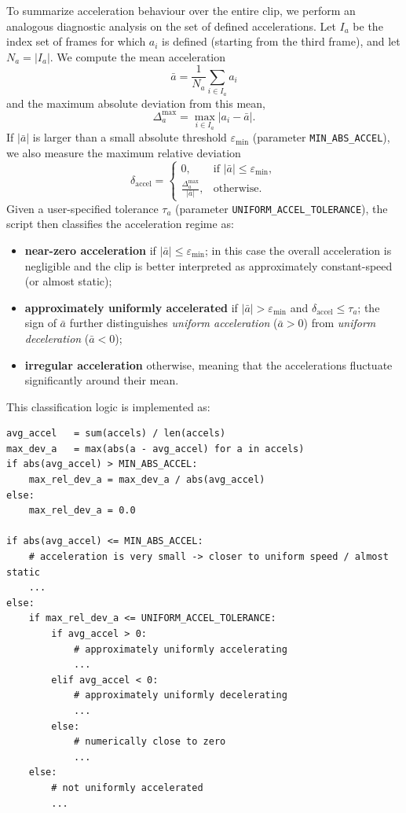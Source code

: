 To summarize acceleration behaviour over the entire clip, we perform an analogous diagnostic analysis on the set of defined accelerations. Let \(I_a\) be the index set of frames for which \(a_i\) is defined (starting from the third frame), and let \(N_a = |I_a|\). We compute the mean acceleration
\[
\bar{a} = \frac{1}{N_a} \sum_{i \in I_a} a_i
\]
and the maximum absolute deviation from this mean,
\[
\Delta_a^{\max} = \max_{i \in I_a} |a_i - \bar{a}|.
\]
If \(|\bar{a}|\) is larger than a small absolute threshold \(\varepsilon_{\min}\) (parameter \texttt{MIN\_ABS\_ACCEL}), we also measure the maximum relative deviation
\[
\delta_{\text{accel}} =
\begin{cases}
0, & \text{if } |\bar{a}| \le \varepsilon_{\min}, \\[4pt]
\displaystyle \frac{\Delta_a^{\max}}{|\bar{a}|}, & \text{otherwise.}
\end{cases}
\]
Given a user-specified tolerance \(\tau_a\) (parameter \texttt{UNIFORM\_ACCEL\_TOLERANCE}), the script then classifies the acceleration regime as:
\begin{itemize}
  \item \textbf{near-zero acceleration} if \(|\bar{a}| \le \varepsilon_{\min}\); in this case the overall acceleration is negligible and the clip is better interpreted as approximately constant-speed (or almost static);
  \item \textbf{approximately uniformly accelerated} if \(|\bar{a}| > \varepsilon_{\min}\) and \(\delta_{\text{accel}} \le \tau_a\); the sign of \(\bar{a}\) further distinguishes \emph{uniform acceleration} (\(\bar{a} > 0\)) from \emph{uniform deceleration} (\(\bar{a} < 0\));
  \item \textbf{irregular acceleration} otherwise, meaning that the accelerations fluctuate significantly around their mean.
\end{itemize}
This classification logic is implemented as:
\begin{verbatim}
avg_accel   = sum(accels) / len(accels)
max_dev_a   = max(abs(a - avg_accel) for a in accels)
if abs(avg_accel) > MIN_ABS_ACCEL:
    max_rel_dev_a = max_dev_a / abs(avg_accel)
else:
    max_rel_dev_a = 0.0

if abs(avg_accel) <= MIN_ABS_ACCEL:
    # acceleration is very small -> closer to uniform speed / almost static
    ...
else:
    if max_rel_dev_a <= UNIFORM_ACCEL_TOLERANCE:
        if avg_accel > 0:
            # approximately uniformly accelerating
            ...
        elif avg_accel < 0:
            # approximately uniformly decelerating
            ...
        else:
            # numerically close to zero
            ...
    else:
        # not uniformly accelerated
        ...
\end{verbatim}

